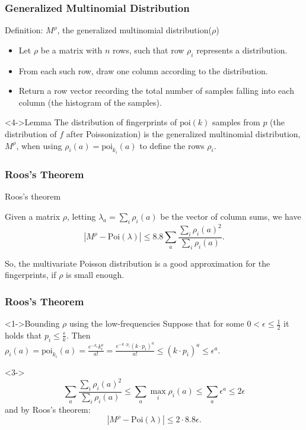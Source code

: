 \documentclass[handout]{beamer}
\newcommand{\eps}{\epsilon} \newcommand{\lam}{\lambda}
\begin{document}
\begin{frame}
  \frametitle{Generalized Multinomial Distribution}
  \begin{block}{Definition: $M^\rho$, the generalized multinomial
      distribution($\rho$)}
  
    \begin{itemize}
    \item<1-> Let $\rho$ be a matrix with $n$ rows, such that row
      $\rho_i$ represents a distribution.
    \item<2-> From each such row, draw one column according to the
      distribution.
    \item<3-> Return a row vector recording the total number of
      samples falling into each column (the histogram of the samples).
    \end{itemize}
  \end{block}

  \begin{block}<4->{Lemma} The distribution of fingerprints of
    $\mbox{poi}(k)$ samples from $p$ (the distribution of $f$ after
    Poissonization) is the generalized multinomial distribution,
    $M^\rho$, when using $\rho_i(a)=\mbox{poi}_{k_i}(a)$ to define the
    rows $\rho_i$.
  \end{block}
\end{frame}

\begin{frame}
  \frametitle{Roos's Theorem}
  \begin{block}{Roos's theorem}
    
    Given a matrix $\rho$, letting $\lambda_a=\sum_i\rho_i(a)$ be the
    vector of column sums, we have
    \begin{equation*}
      |M^\rho-\mbox{Poi}(\lambda)|\le
      8.8\sum_a\frac{\sum_i\rho_i(a)^2}{\sum_i \rho_i(a)}.
    \end{equation*}
  \end{block}
  So, the multivariate Poisson distribution is a good approximation
  for the fingerprints, if $\rho$ is small enough.
\end{frame}
\begin{frame}
  \frametitle{Roos's Theorem}

  \begin{block}<1->{Bounding $\rho$ using the low-frequencies}
    Suppose that for some $0<\eps\le\frac{1}{2}$ it holds that $p_i\le
    \frac{\eps}{k}$. Then
    $\rho_i(a)=\mbox{poi}_{k_i}(a)=\frac{e^{-k_i}k_i^a}{a!}=\frac{e^{-k\cdot
        p_i}(k\cdot p_i)^a}{a!}\le (k\cdot p_i) ^a\le \eps^a$.
  \end{block}

  \begin{block}<3->{}
    \begin{equation*}
      \sum_a\frac{\sum_i\rho_i(a)^2}{\sum_i \rho_i(a)}\le \sum_a\max_i \rho_i(a)\le \sum_a \eps^a\le 2\eps
    \end{equation*}
    and by Roos's theorem:
    \begin{equation*}
      |M^\rho-\mbox{Poi}(\lambda)|\le 2\cdot 8.8\eps.       
    \end{equation*}
  \end{block}
\end{frame}
\end{document}
